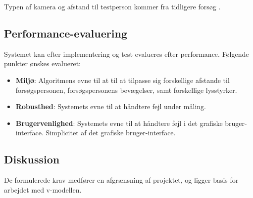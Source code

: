 \documentclass[rapport.tex]{subfiles}
\begin{document}
	Typen af kamera og afstand til testperson kommer fra tidligere forsøg \cite{Siboska}.
	\subsection{Performance-evaluering}
	Systemet kan efter implementering og test evalueres efter performance. Følgende punkter ønskes evalueret:
	\begin{itemize}
		\item \textbf{Miljø}: Algoritmens evne til at til at tilpasse sig forskellige afstande til forsøgspersonen, forsøgspersonens bevægelser, samt forskellige lysstyrker. 
		\item \textbf{Robusthed}: Systemets evne til at håndtere fejl under måling. 
		\item \textbf{Brugervenlighed}: Systemets evne til at håndtere fejl i det grafiske bruger-interface. Simplicitet af det grafiske bruger-interface.  
	\end{itemize}
	
	\subsection{Diskussion}
	De formulerede krav medfører en afgrænsning af projektet, og ligger basis for arbejdet med v-modellen. 
	
		
\end{document}

